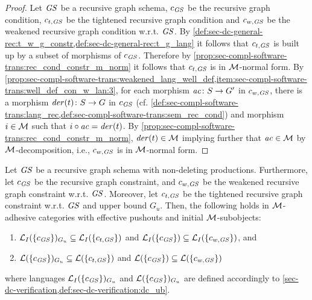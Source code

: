 \begin{proof}
Let $\mathit{GS}$ be a recursive graph schema, $c_\mathit{GS}$ be the recursive graph condition, $c_{t,\mathit{GS}}$ be the tightened recursive graph condition and $c_{w,\mathit{GS}}$ be the weakened recursive graph condition w.r.t. $\mathit{GS}$.
By \cref{def:sec-dc-general-rec:t_w_g_constr,def:sec-dc-general-rec:t_g_lang} it follows that $c_{t,\mathit{GS}}$ is built up by a subset of morphisms of $c_\mathit{GS}$.
Therefore by \cref{prop:sec-compl-software-trans:rec_cond_constr_m_norm} it follows that $c_{t,\mathit{GS}}$ is in ${\cal M}$-normal form.
By \cref{prop:sec-compl-software-trans:weakened_lang_well_def,item:sec-compl-software-trans:well_def_con_w_lan:3}, for each morphism $\mathit{ac}\colon S \to G'$ in $c_{w,\mathit{GS}}$, there is a morphism $\mathit{der}(t)\colon S \to G$ in $c_\mathit{GS}$ (cf. \cref{def:sec-compl-software-trans:lang_rec,def:sec-compl-software-trans:sem_rec_cond}) and morphism $i \in {\cal M}$ such that $i \circ \mathit{ac}=\mathit{der}(t)$.
By \cref{prop:sec-compl-software-trans:rec_cond_constr_m_norm}, $\mathit{der}(t) \in {\cal M}$ implying further that $\mathit{ac} \in {\cal M}$ by ${\cal M}$-decomposition, i.e., $c_{w,\mathit{GS}}$ is in ${\cal M}$-normal form.
\end{proof}

\begin{proposition}
\label{thm:sec-compl-software-trans:comp-lang-constraints}
Let $\mathit{GS}$ be a recursive graph schema with non-deleting productions.
Furthermore, let $c_\mathit{GS}$ be the recursive graph constraint, and $c_{w,\mathit{GS}}$ be the weakened recursive graph constraint w.r.t. $\mathit{GS}$.
Moreover, let $c_{t,\mathit{GS}}$ be the tightened recursive graph constraint w.r.t. $\mathit{GS}$ and upper bound $G_u$.
Then, the following holds in ${\cal M}$-adhesive categories with effective pushouts and initial ${\cal M}$-subobjects:
\begin{enumerate}
  \item $\mathcal{L}_I(\{c_\mathit{GS}\})_{G_u} \subseteq \mathcal{L}_I(\{c_{t,\mathit{GS}}\})$ and $\mathcal{L}_I(\{c_\mathit{GS}\}) \subseteq \mathcal{L}_I(\{c_{w,\mathit{GS}}\})$, and
  \item $\mathcal{L}(\{c_\mathit{GS}\})_{G_u} \subseteq \mathcal{L}(\{c_{t,\mathit{GS}}\})$ and $\mathcal{L}(\{c_\mathit{GS}\}) \subseteq \mathcal{L}(\{c_{w,\mathit{GS}}\})$
\end{enumerate}
where languages $\mathcal{L}_I(\{c_\mathit{GS}\})_{G_u}$ and $\mathcal{L}(\{c_\mathit{GS}\})_{G_u}$ are defined accordingly to \cref{sec-dc-verification,def:sec-dc-verification:dc_ub}.
\envEndMarker
\end{proposition}

